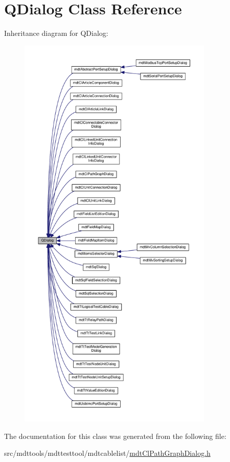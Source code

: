 \hypertarget{class_q_dialog}{\section{Q\-Dialog Class Reference}
\label{class_q_dialog}
}


Inheritance diagram for Q\-Dialog\-:
\nopagebreak
\begin{figure}[H]
\begin{center}
\leavevmode
\includegraphics[height=550pt]{class_q_dialog__inherit__graph}
\end{center}
\end{figure}


The documentation for this class was generated from the following file\-:\begin{DoxyCompactItemize}
\item 
src/mdttools/mdttesttool/mdtcablelist/\hyperlink{mdt_cl_path_graph_dialog_8h}{mdt\-Cl\-Path\-Graph\-Dialog.\-h}\end{DoxyCompactItemize}
